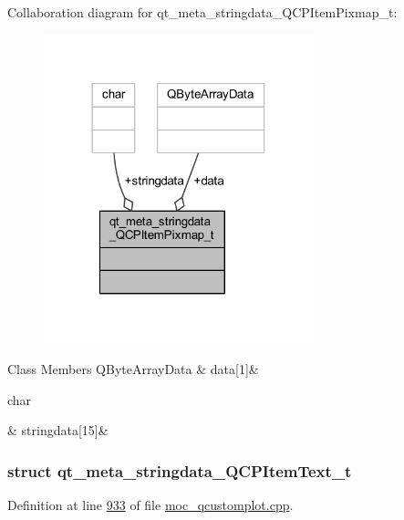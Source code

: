 Collaboration diagram for qt\+\_\+meta\+\_\+stringdata\+\_\+\+Q\+C\+P\+Item\+Pixmap\+\_\+t\+:
\nopagebreak
\begin{figure}[H]
\begin{center}
\leavevmode
\includegraphics[width=222pt]{db/da2/a00300}
\end{center}
\end{figure}
\begin{DoxyFields}{Class Members}
\hypertarget{a00067_ac2c2965eddf58c85d34bd6a8bc3608fe}{Q\+Byte\+Array\+Data}\label{a00067_ac2c2965eddf58c85d34bd6a8bc3608fe}
&
data\mbox{[}1\mbox{]}&
\\
\hline

\hypertarget{a00067_a4cee80f7af4fafbb06fc161890ced10e}{char}\label{a00067_a4cee80f7af4fafbb06fc161890ced10e}
&
stringdata\mbox{[}15\mbox{]}&
\\
\hline

\end{DoxyFields}
\label{d5/d13/a00205}
\hypertarget{a00067_d5/d13/a00205}{}
\subsubsection{struct qt\+\_\+meta\+\_\+stringdata\+\_\+\+Q\+C\+P\+Item\+Text\+\_\+t}


Definition at line \hyperlink{a00067_source_l00933}{933} of file \hyperlink{a00067_source}{moc\+\_\+qcustomplot.\+cpp}.



